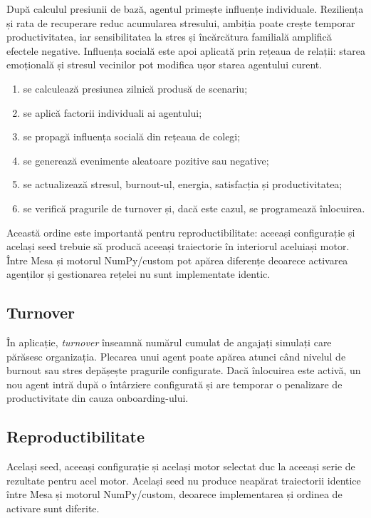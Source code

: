 \documentclass[12pt,a4paper]{article}
\begin{document}
După calculul presiunii de bază, agentul primește influențe individuale. Reziliența și rata de recuperare reduc acumularea stresului, ambiția poate crește temporar productivitatea, iar sensibilitatea la stres și încărcătura familială amplifică efectele negative. Influența socială este apoi aplicată prin rețeaua de relații: starea emoțională și stresul vecinilor pot modifica ușor starea agentului curent.

\begin{enumerate}
    \item se calculează presiunea zilnică produsă de scenariu;
    \item se aplică factorii individuali ai agentului;
    \item se propagă influența socială din rețeaua de colegi;
    \item se generează evenimente aleatoare pozitive sau negative;
    \item se actualizează stresul, burnout-ul, energia, satisfacția și productivitatea;
    \item se verifică pragurile de turnover și, dacă este cazul, se programează înlocuirea.
\end{enumerate}

Această ordine este importantă pentru reproductibilitate: aceeași configurație și același seed trebuie să producă aceeași traiectorie în interiorul aceluiași motor. Între Mesa și motorul NumPy/custom pot apărea diferențe deoarece activarea agenților și gestionarea rețelei nu sunt implementate identic.

\vspace{0.4cm}
\subsection{Turnover}

În aplicație, \textit{turnover} înseamnă numărul cumulat de angajați simulați care părăsesc organizația. Plecarea unui agent poate apărea atunci când nivelul de burnout sau stres depășește pragurile configurate. Dacă înlocuirea este activă, un nou agent intră după o întârziere configurată și are temporar o penalizare de productivitate din cauza onboarding-ului.

\vspace{0.4cm}
\subsection{Reproductibilitate}

Același seed, aceeași configurație și același motor selectat duc la aceeași serie de rezultate pentru acel motor. Același seed nu produce neapărat traiectorii identice între Mesa și motorul NumPy/custom, deoarece implementarea și ordinea de activare sunt diferite.
\end{document}
